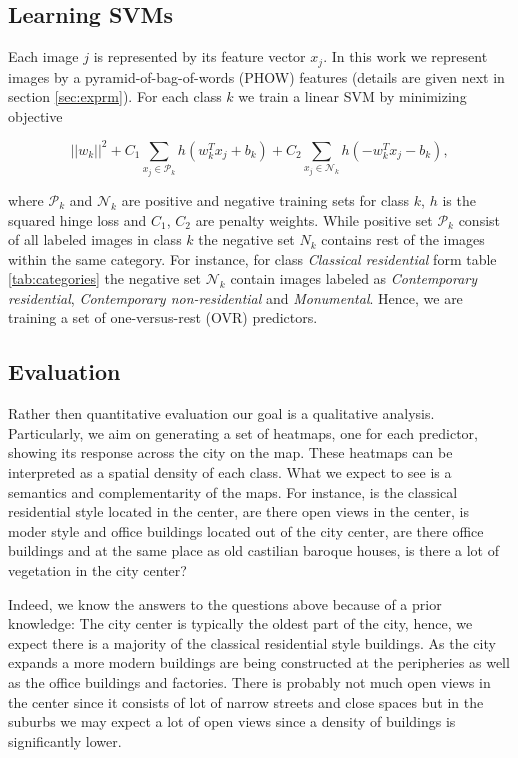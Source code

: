 \documentclass[runningheads, table]{llncs}
\begin{document}
\subsection{Learning SVMs}
  \vspace{-1mm}
  Each image $j$ is represented by its feature vector $x_j$. In this work we represent images by a pyramid-of-bag-of-words (PHOW) features (details are given next in section \ref{sec:exprm}). For each class $k$ we train a linear SVM by minimizing objective

\begin{equation}
  ||w_k||^{2} +C_1\sum_{x_j \in \mathcal P_k}h
              \left(
                w_k^T x_j +b_k
              \right)
              +C_2\sum_{x_j \in \mathcal N_k}h
              \left(
                -w_k^T x_j - b_k
              \right),   
  \label{eq:obj} 
\end{equation}

\noindent
where $\mathcal{P}_k$ and $\mathcal{N}_k$ are positive and negative training sets for class $k$, $h$ is the squared hinge loss and $C_1$, $C_2$ are penalty weights. While positive set $\mathcal{P}_k$ consist of all labeled images in class $k$ the negative set $N_k$ contains rest of the images within the same category. For instance, for class \emph{Classical residential} form table \ref{tab:categories} the negative set $\mathcal{N}_k$ contain images labeled as \emph{Contemporary residential}, \emph{Contemporary non-residential} and \emph{Monumental}. Hence, we are training a set of one-versus-rest (OVR) predictors. 

\subsection{Evaluation}
\vspace{-1mm}
Rather then quantitative evaluation our goal is a qualitative analysis. Particularly, we aim on generating a set of heatmaps, one for each predictor, showing its response across the city on the map. These heatmaps can be interpreted as a spatial density of each class. What we expect to see is a semantics and complementarity of the maps. For instance, is the classical residential style located in the center, are there open views in the center, is moder style and office buildings located out of the city center, are there office buildings and at the same place as old castilian baroque houses, is there a lot of vegetation in the city center?

Indeed, we know the answers to the questions above because of a prior knowledge: The city center is typically the oldest part of the city, hence, we expect there is a majority of the classical residential style buildings. As the city expands a more modern buildings are being constructed at the peripheries as well as the office buildings and factories. There is probably not much open views in the center since it consists of lot of narrow streets and close spaces but in the suburbs we may expect a lot of open views since a density of buildings is significantly lower. 
\end{document}
